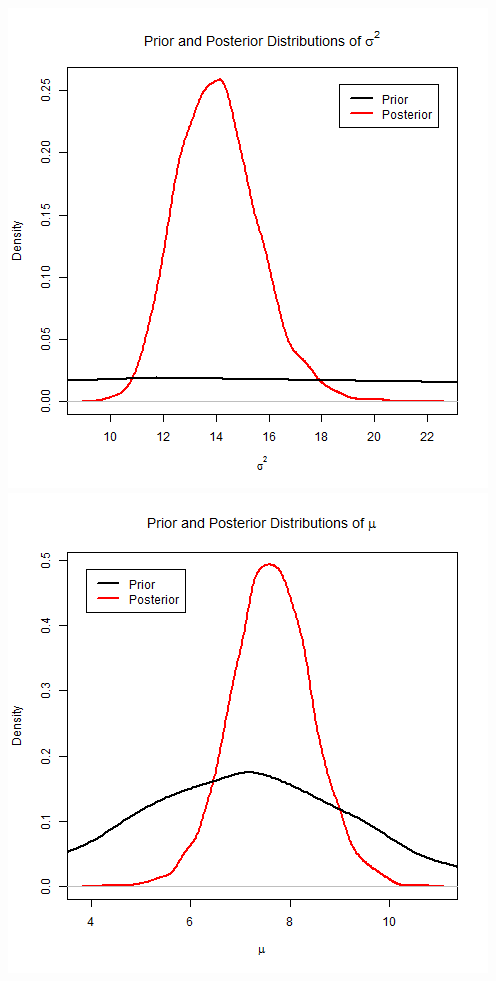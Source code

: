 \documentclass{article}
\begin{document}
\begin{enumerate}[8.1]
\begin{enumerate}[(a)]
\includegraphics[scale = 0.3]{sig-density.png}
\includegraphics[scale = 0.3]{mu-density.png}

\end{enumerate}
\end{enumerate}
\end{document}
